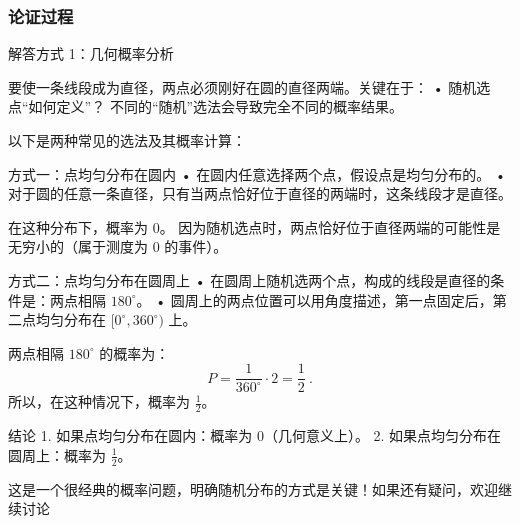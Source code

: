 \subsubsection{论证过程}
解答方式 1：几何概率分析

要使一条线段成为直径，两点必须刚好在圆的直径两端。关键在于：
	•	随机选点“如何定义”？
不同的“随机”选法会导致完全不同的概率结果。

以下是两种常见的选法及其概率计算：

方式一：点均匀分布在圆内
	•	在圆内任意选择两个点，假设点是均匀分布的。
	•	对于圆的任意一条直径，只有当两点恰好位于直径的两端时，这条线段才是直径。

在这种分布下，概率为 0。
因为随机选点时，两点恰好位于直径两端的可能性是无穷小的（属于测度为 0 的事件）。

方式二：点均匀分布在圆周上
	•	在圆周上随机选两个点，构成的线段是直径的条件是：两点相隔 $180^\circ$。
	•	圆周上的两点位置可以用角度描述，第一点固定后，第二点均匀分布在 $[0^\circ, 360^\circ)$ 上。

两点相隔 $180^\circ$ 的概率为：
$$
P = \frac{1}{360^\circ} \cdot 2 = \frac{1}{2}~.
$$
所以，在这种情况下，概率为 $\frac{1}{2}$。

结论
	1.	如果点均匀分布在圆内：概率为 $0$（几何意义上）。
	2.	如果点均匀分布在圆周上：概率为 $\frac{1}{2}$。

这是一个很经典的概率问题，明确随机分布的方式是关键！如果还有疑问，欢迎继续讨论~